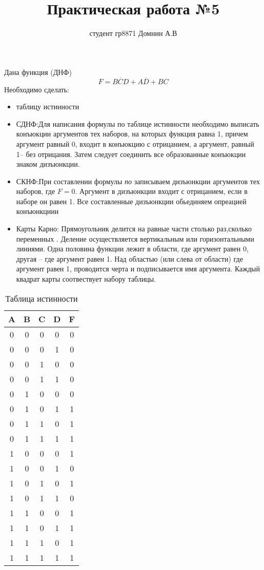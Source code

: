 \documentclass{article}
\title{Практическая работа №5}
\author{студент гр8871 Домнин А.В }
\begin{document}
\maketitle
\newcommand{\D}{10}
\newcommand{\I}{0.6}
\newcommand{\B}{0.2}
Дана функция (ДНФ)
$$
F=B\overline{C}D+A\overline{D}+BC
$$
Необходимо сделать:
\begin{itemize}
    \item таблицу истинности
    \item СДНФ:Для написания формулы по таблице истинности необходимо выписать конъюкции аргументов тех наборов, на которых функция равна 1, причем аргумент равный 0, входит в конъюкцию с отрицанием, а аргумент, равный 1-- без отрицания. Затем следует соединить все образованные конъюкции знаком дизъюнкции.
    \item СКНФ:При составлении формулы {\it по} записываем дизъюнкции аргументов тех наборов, где $F=0$. Аргумент в дизъюнкции входит с отрицанием, если в наборе он равен 1. Все составленные дизъюнкции обьединяем опреацией конъюнкциии
    \item Карты Карно: Прямоугольник делится на равные части столько раз,сколько переменных . Деление осуществляется вертикальным или горизонтальными линиями. Одна половина функции лежит в области, где аргумент равен 0, другая -- где аргумент равен 1. Над областью (или слева от области) где аргумент равен 1, проводится черта и подписывается имя аргумента. Каждый квадрат карты соотвествует набору таблицы.
\end{itemize}



\begin{table}[ht]
\centering
\begin{tabular}{|c|c|c|c|c|} \hline
A & B & C & D & F \\
\hline
0 & 0 & 0 & 0 & 0 \\%
\hline
0 & 0 & 0 & 1 & 0 \\%
\hline
0 & 0 & 1 & 0 & 0 \\%
\hline
0 & 0 & 1 & 1 & 0 \\%
\hline
0 & 1 & 0 & 0 & 0 \\%
\hline
0 & 1 & 0 & 1 & 1 \\%
\hline
0 & 1 & 1 & 0 & 1 \\%
\hline
0 & 1 & 1 & 1 & 1 \\%
\hline
1 & 0 & 0 & 0 & 1 \\%
\hline
1 & 0 & 0 & 1 & 0 \\%
\hline
1 & 0 & 1 & 0 & 1 \\%
\hline
1 & 0 & 1 & 1 & 0 \\%
\hline
1 & 1 & 0 & 0 & 1 \\%
\hline
1 & 1 & 0 & 1 & 1 \\%
\hline
1 & 1 & 1 & 0 & 1 \\%
\hline
1 & 1 & 1 & 1 & 1 \\%
\hline
\end{tabular}
\label{table}
\caption{Таблица истинности}
\end{table}
\end{document}
